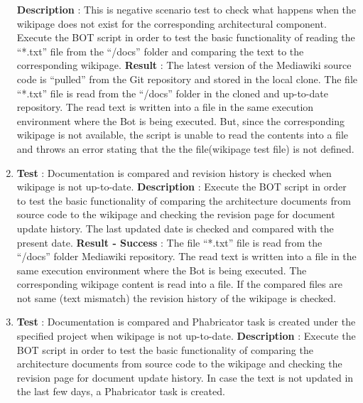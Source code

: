 \begin{enumerate}
\newline
\newline \textbf{Description} : This is negative scenario test to check what happens when the wikipage does not exist for the corresponding architectural component. Execute the BOT script in order to test the basic functionality of reading the \enquote{*.txt} file from the \enquote{/docs} folder and comparing the text to the corresponding wikipage. 
\newline 
\newline \textbf{Result} : The latest version of the Mediawiki source code is \enquote{pulled} from the Git repository and stored in the local clone. The file \enquote{*.txt} file is read from the \enquote{/docs} folder in the cloned and up-to-date repository. The read text is written into a file in the same execution environment where the Bot is being executed. But, since the corresponding wikipage is not available, the script is unable to read the contents into a file and throws an error stating that the the file(wikipage test file) is not defined.
\newline
\item \textbf{Test} : Documentation is compared and revision history is checked when wikipage is not up-to-date.
\newline
\newline \textbf{Description} : Execute the BOT script in order to test the basic functionality of comparing the architecture documents from source code to the wikipage and checking the revision page for document update history. The last updated date is checked and compared with the present date.
\newline 
\newline \textbf{Result - Success} : The file \enquote{*.txt} file is read from the \enquote{/docs} folder Mediawiki repository. The read text is written into a file in the same execution environment where the Bot is being executed. The corresponding wikipage content is read into a file. If the compared files are not same (text mismatch) the revision history of the wikipage is checked.
\newline
\item \textbf{Test} : Documentation is compared and Phabricator task is created under the specified project when wikipage is not up-to-date.
\newline
\newline \textbf{Description} : Execute the BOT script in order to test the basic functionality of comparing the architecture documents from source code to the wikipage and checking the revision page for document update history. In case the text is not updated in the last few days, a Phabricator task is created.

\end{enumerate}
